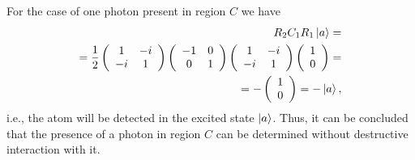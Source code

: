 For the case of one photon present in region $C$ we have
\begin{eqnarray}
  R_2 C_1 R_1 \ket{a} =
  \nonumber \\
  =
  \frac{1}{2}
  \left(
  \begin{array} {cc}
    1 & -i
    \\
    -i & 1 
  \end{array}
  \right)
  \left(
  \begin{array} {cc}
    -1 & 0
    \\
    0 & 1 
  \end{array}
  \right)
  \left(
  \begin{array} {cc}
    1 & -i
    \\
    -i & 1 
  \end{array}
  \right)
  \left(
  \begin{array} {c}
    1
    \\
    0
  \end{array}
  \right) =
  \nonumber \\
  =
  - 
  \left(
  \begin{array} {c}
    1
    \\
    0
  \end{array}
  \right) =
  - \ket{a},
  \nonumber
\end{eqnarray}
i.e., the atom will be detected in the excited state
$\ket{a}$. Thus, it can be concluded that the presence of a photon in region $C$ can be determined without destructive interaction with it.